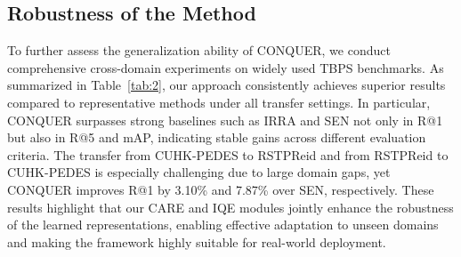 \documentclass{article}
\begin{document}
\subsection{Robustness of the Method}

To further assess the generalization ability of CONQUER, we conduct comprehensive cross-domain experiments on widely used TBPS benchmarks. As summarized in Table~\ref{tab:2}, our approach consistently achieves superior results compared to representative methods under all transfer settings. In particular, CONQUER surpasses strong baselines such as IRRA and SEN not only in R@1 but also in R@5 and mAP, indicating stable gains across different evaluation criteria. The transfer from CUHK-PEDES to RSTPReid and from RSTPReid to CUHK-PEDES is especially challenging due to large domain gaps, yet CONQUER improves R@1 by 3.10\% and 7.87\% over SEN, respectively. These results highlight that our CARE and IQE modules jointly enhance the robustness of the learned representations, enabling effective adaptation to unseen domains and making the framework highly suitable for real-world deployment.
\end{document}
